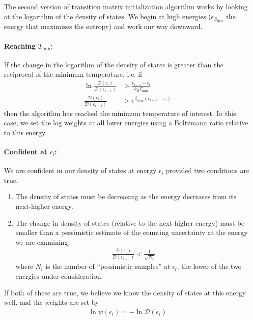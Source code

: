 \documentclass[letterpaper,twocolumn,amsmath,amssymb,pre,aps,10pt]{revtex4-1}
\begin{document}
The second version of transition matrix initialization algorithm works
by looking at the logarithm of the density of states.  We begin at
high energies ($\epsilon_{S_{\max}}$ the energy that maximizes the entropy) and work our way
downward.

\paragraph{Reaching $T_{\min}$:}
If the change in the logarithm of the density of states is greater
than the reciprocal of the minimum temperature, i.e. if
\begin{align}
  \ln\frac{\mathcal D(\epsilon_i)}{\mathcal D(\epsilon_{i-1})} &>
  \frac{\epsilon_{i-1} - \epsilon_i}{k_BT_{\min}}
  \\
  \frac{\mathcal D(\epsilon_i)}{\mathcal D(\epsilon_{i-1})} &>
  e^{\beta_{\max}(\epsilon_{i-1} - \epsilon_i)}
\end{align}
then the algorithm has reached the minimum temperature of interest.
In this case, we set the log weights at all lower energies using a
Boltzmann ratio relative to this energy.
\paragraph{Confident at $\epsilon_i$:} We are confident in our density
of states at energy $\epsilon_i$ provided two conditions are true.
\begin{enumerate}
\item The density of states must be decreasing as the energy decreases
  from its next-higher energy.
\item The change in density of states (relative to the next higher
  energy) must be smaller than a pessimistic estimate of the counting
  uncertainty at the energy we are examining:
  \begin{align}
    \frac{\mathcal D(\epsilon_i)}{\mathcal D(\epsilon_{i-1})} < \frac1{\sqrt{N_i}}
  \end{align}
  where $N_i$ is the number of ``pessimistic
  samples'' at $\epsilon_i$, the lower of the two energies under
  consideration.
\end{enumerate}
If both of these are true, we believe we know the density of states at
this energy well, and the weights are set by
\begin{align}
  \ln w(\epsilon_i) = -\ln\mathcal{D}(\epsilon_i)
\end{align}
\end{document}
